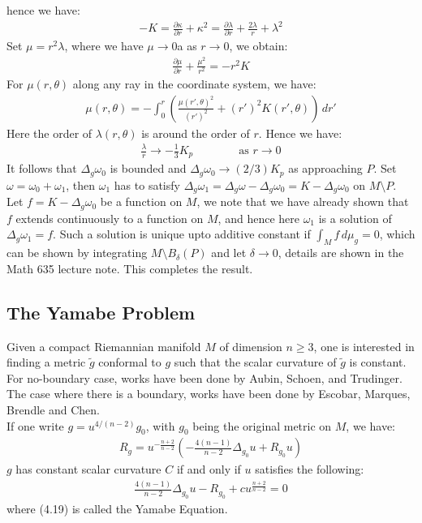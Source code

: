 \documentclass[11pt]{book}
\theoremstyle{break}
\theoremstyle{break}
\newcommand{\pd}{\partial}
\newcommand{\that}[1]{\widetilde{#1}}
\begin{document}
hence we have:
\begin{align*}
-K = \frac{\pd \kappa}{\pd r} + \kappa^2 = \frac{\pd \lambda}{\pd r} + \frac{2\lambda}{r} + \lambda^2 
\end{align*}
Set $\mu = r^2\lambda$, where we have $\mu \to 0$a as $r \to 0$, we obtain:
\begin{align*}
\frac{\pd \mu }{\pd r} + \frac{\mu^2}{r^2} = -r^2 K
\end{align*}
For $\mu(r,\theta)$ along any ray in the coordinate system, we have:
\begin{align*}
\mu(r,\theta) = -\int_0^r \left( \frac{\mu (r', \theta)^2}{(r')^2} + (r')^2 K(r',\theta)\right) \, dr'
\end{align*}
Here the order of $\lambda(r,\theta)$ is around the order of $r$. Hence we have:
\begin{align*}
\frac{\lambda}{r} \to -\frac{1}{3}K_p \qquad\qquad \text{as }r \to 0
\end{align*}
It follows that $\Delta_g\omega_0$ is bounded and $\Delta_g \omega_0 \to (2/3)K_p$ as approaching $P$. Set $\omega = \omega_0 + \omega_1$, then $\omega_1$ has to satisfy $\Delta_g \omega_1 = \Delta_g \omega - \Delta_g \omega_0=K-\Delta_g \omega_0$ on $M\setminus P$. Let $f = K - \Delta_g \omega_0$ be a function on $M$, we note that we have already shown that $f$ extends continuously to a function on $M$, and hence here $\omega_1$ is a solution of $\Delta_g \omega_1 = f$. Such a solution is unique upto additive constant if $\int_M f\, d\mu_g = 0$, which can be shown by integrating $M\setminus B_\delta(P)$ and let $\delta \to 0$, details are shown in the Math 635 lecture note. This completes the result.\\


\newpage
\subsection{The Yamabe Problem}
Given a compact Riemannian manifold $M$ of dimension $n\geq 3$, one is interested in finding a metric $\that{g}$ conformal to $g$ such that the scalar curvature of $\that{g}$ is constant. For no-boundary case, works have been done by Aubin, Schoen, and Trudinger. The case where there is a boundary, works have been done by Escobar, Marques, Brendle and Chen.\\

If one write $g = u^{4/(n-2)}g_0$, with $g_0$ being the original metric on $M$, we have:
\begin{align*}
R_g = u^{-\frac{n+2}{n-2}}\left(- \frac{4(n-1)}{n-2}\Delta_{g_0}u + R_{g_0}u\right)
\end{align*}
$g$ has constant scalar curvature $C$ if and only if $u$ satisfies the following:
\begin{align}
\frac{4(n-1)}{n-2}\Delta_{g_0}u - R_{g_0} + cu^{\frac{n+2}{n-2}}=0
\end{align}
where (4.19) is called the Yamabe Equation.\\
\end{document}
